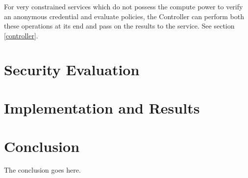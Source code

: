 \documentclass[journal]{IEEEtran}
\begin{document}
For very constrained services which do not possess the compute power to verify an anonymous credential and evaluate policies, the Controller can perform both these operations at its end and pass on the results to the service. See section \ref{controller}.

\section{Security Evaluation} \label{seceval}

\section{Implementation and Results} \label{implementation}


\section{Conclusion}
The conclusion goes here.



\end{document}
